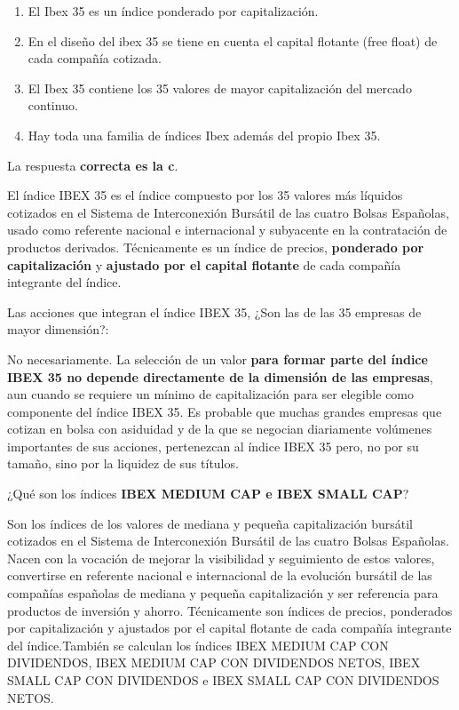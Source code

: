 \documentclass[
  letterpaper,
  DIV=11,
  numbers=noendperiod]{scrreprt}
\begin{document}
\begin{enumerate}
\def\labelenumi{\alph{enumi})}
\item
  El Ibex 35 es un índice ponderado por capitalización.
\item
  En el diseño del ibex 35 se tiene en cuenta el capital flotante (free
  float) de cada compañía cotizada.
\item
  El Ibex 35 contiene los 35 valores de mayor capitalización del mercado
  continuo.
\item
  Hay toda una familia de índices Ibex además del propio Ibex 35.
\end{enumerate}

\begin{tcolorbox}[enhanced jigsaw, left=2mm, opacityback=0, colback=white, breakable, arc=.35mm, bottomrule=.15mm, rightrule=.15mm, toprule=.15mm, leftrule=.75mm, colframe=quarto-callout-tip-color-frame]
\begin{minipage}[t]{5.5mm}
\textcolor{quarto-callout-tip-color}{\faLightbulb}
\end{minipage}%
\begin{minipage}[t]{\textwidth - 5.5mm}

La respuesta \textbf{correcta es la c}.

El índice IBEX 35 es el índice compuesto por los 35 valores más líquidos
cotizados en el Sistema de Interconexión Bursátil de las cuatro Bolsas
Españolas, usado como referente nacional e internacional y subyacente en
la contratación de productos derivados. Técnicamente es un índice de
precios, \textbf{ponderado por capitalización} y \textbf{ajustado por el
capital flotante} de cada compañía integrante del índice.

Las acciones que integran el índice IBEX 35, ¿Son las de las 35 empresas
de mayor dimensión?:

No necesariamente. La selección de un valor \textbf{para formar parte
del índice IBEX 35 no depende directamente de la dimensión de las
empresas}, aun cuando se requiere un mínimo de capitalización para ser
elegible como componente del índice IBEX 35. Es probable que muchas
grandes empresas que cotizan en bolsa con asiduidad y de la que se
negocian diariamente volúmenes importantes de sus acciones, pertenezcan
al índice IBEX 35 pero, no por su tamaño, sino por la liquidez de sus
títulos.

¿Qué son los índices \textbf{IBEX MEDIUM CAP e IBEX SMALL CAP}?

Son los índices de los valores de mediana y pequeña capitalización
bursátil cotizados en el Sistema de Interconexión Bursátil de las cuatro
Bolsas Españolas. Nacen con la vocación de mejorar la visibilidad y
seguimiento de estos valores, convertirse en referente nacional e
internacional de la evolución bursátil de las compañías españolas de
mediana y pequeña capitalización y ser referencia para productos de
inversión y ahorro. Técnicamente son índices de precios, ponderados por
capitalización y ajustados por el capital flotante de cada compañía
integrante del índice.También se calculan los índices IBEX MEDIUM CAP
CON DIVIDENDOS, IBEX MEDIUM CAP CON DIVIDENDOS NETOS, IBEX SMALL CAP CON
DIVIDENDOS e IBEX SMALL CAP CON DIVIDENDOS NETOS.


\end{minipage}
\end{tcolorbox}
\end{document}
